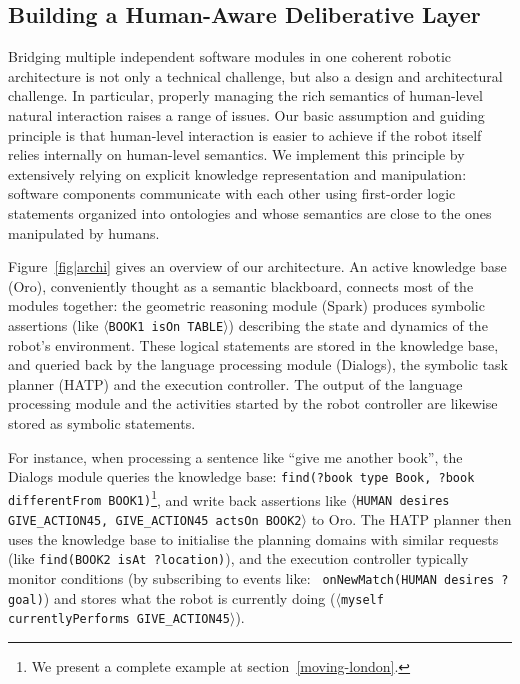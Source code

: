 \documentclass[preprint,3p,times]{elsarticle}
\newcommand{\stmt}[1]{{\footnotesize\tt$\langle$#1\relax$\rangle$}}
\begin{document}
\subsection{Building a Human-Aware Deliberative Layer}

Bridging multiple independent software modules in one coherent robotic
architecture is not only a technical challenge, but also a design and
architectural challenge. In particular, properly managing the rich semantics of
human-level natural interaction raises a range of issues. Our basic assumption
and guiding principle is that human-level interaction is easier to achieve if
the robot itself relies internally on human-level semantics.  We implement this
principle by extensively relying on explicit knowledge representation and
manipulation: software components communicate with each other using first-order
logic statements organized into ontologies and whose semantics are close to the
ones manipulated by humans.

Figure~\ref{fig|archi} gives an overview of our architecture. An active
knowledge base ({\sc Oro}), conveniently thought as a semantic
blackboard, connects most of the modules together: the geometric
reasoning module ({\sc Spark}) produces symbolic assertions (like
\stmt{BOOK1 isOn TABLE}) describing the state and dynamics of the robot's
environment. These logical statements are stored in the knowledge base, and
queried back by the language processing module ({\sc Dialogs}), the symbolic task
planner (HATP) and the execution controller. The output of the language
processing module and the activities started by the robot controller are
likewise stored as symbolic statements.

For instance, when processing a sentence like ``give me another book'', the {\sc
Dialogs} module queries the knowledge base: {\tt \footnotesize find(?book type
Book, ?book differentFrom BOOK1)}\footnote{We present a complete
example at section~\ref{moving-london}.}, and write back assertions like
\stmt{HUMAN desires GIVE\_ACTION45, GIVE\_ACTION45 actsOn BOOK2} to {\sc
Oro}. The HATP planner then uses the knowledge base to initialise the
planning domains with similar requests (like {\tt \footnotesize find(BOOK2 isAt
?location)}), and the execution controller typically monitor
conditions (by subscribing to events like: {\tt \footnotesize
onNewMatch(HUMAN desires ?goal)}) and stores what the robot is currently
doing (\stmt{myself currentlyPerforms GIVE\_ACTION45}).
\end{document}
